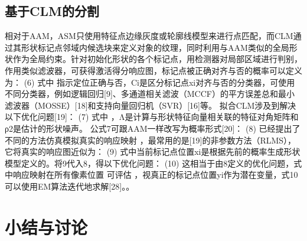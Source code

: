 \subsection{基于CLM的分割}
相对于AAM，ASM只使用特征点边缘灰度或轮廓线模型来进行点匹配，而CLM通过其形状标记点邻域内候选块来定义对象的纹理，同时利用与AAM类似的全局形状作为全局约束。针对初始化形状的各个标记点，用检测器对局部区域进行判别，作用类似滤波器，可获得激活得分响应图，标记点被正确对齐与否的概率可以定义为：
  	(6)
式中 指示定位正确与否，Ci是区分标记点xi对齐与否的分类器，可使用不同分类器，例如逻辑回归[9]、多通道相关滤波（MCCF）的平方误差总和最小滤波器（MOSSE）[18]和支持向量回归机（SVR）[16]等。
拟合CLM涉及到解决以下优化问题[19]： 
  	(7)
式中  ，Λ是计算与形状特征向量相关联的特征对角矩阵和ρ2是估计的形状噪声。
公式7可跟AAM一样改写为概率形式[20]：
  	(8)
已经提出了不同的方法仿真模拟真实的响应映射 ，最常用的是[19]的非参数方法（RLMS），它将真实的响应图近似为： 
	  	(9)
式中当前标记点位置xi是根据先前的概率生成形状模型定义的。将9代入8，得以下优化问题：
  	(10)
这相当于由8定义的优化问题，式中响应映射在所有像素位置  可评估 ，视真正的标记点位置yi作为潜在变量，式10可以使用EM算法迭代地求解[28]。。
 
 
\section{小结与讨论}


